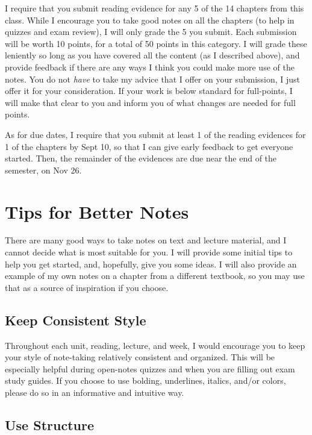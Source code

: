 \documentclass[
  12pt,
  letterpaper,
]{scrartcl}
\begin{document}
I require that you submit reading evidence for any 5 of the 14 chapters
from this class. While I encourage you to take good notes on all the
chapters (to help in quizzes and exam review), I will only grade the 5
you submit. Each submission will be worth 10 points, for a total of 50
points in this category. I will grade these leniently so long as you
have covered all the content (as I described above), and provide
feedback if there are any ways I think you could make more use of the
notes. You do not \emph{have} to take my advice that I offer on your
submission, I just offer it for your consideration. If your work is
below standard for full-points, I will make that clear to you and inform
you of what changes are needed for full points.

As for due dates, I require that you submit at least 1 of the reading
evidences for 1 of the chapters by Sept 10, so that I can give early
feedback to get everyone started. Then, the remainder of the evidences
are due near the end of the semester, on Nov 26.

\section{Tips for Better Notes}\label{tips-for-better-notes}

There are many good ways to take notes on text and lecture material, and
I cannot decide what is most suitable for you. I will provide some
initial tips to help you get started, and, hopefully, give you some
ideas. I will also provide an example of my own notes on a chapter from
a different textbook, so you may use that as a source of inspiration if
you choose.

\subsection{Keep Consistent Style}\label{keep-consistent-style}

Throughout each unit, reading, lecture, and week, I would encourage you
to keep your style of note-taking relatively consistent and organized.
This will be especially helpful during open-notes quizzes and when you
are filling out exam study guides. If you choose to use bolding,
underlines, italics, and/or colors, please do so in an informative and
intuitive way.

\subsection{Use Structure}\label{use-structure}
\end{document}
